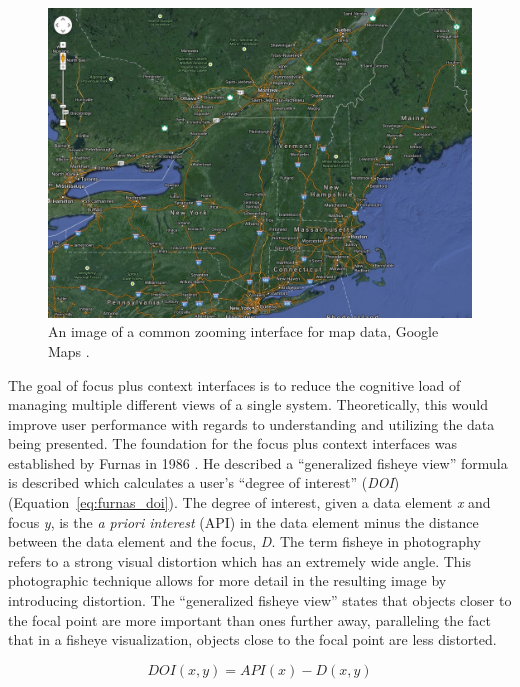 \begin{figure}[htp] \centering
    \includegraphics[width=0.8\linewidth]{img/zoom_interface.jpg}
    \caption[Zooming Interface]{An image of a common zooming interface for map data, Google Maps \cite{google_maps}.}
    \label{fig:google_maps}
\end{figure}

The goal of focus plus context interfaces is to reduce the cognitive load of managing multiple different views 
of a single system. Theoretically, this would improve user performance with regards to understanding and 
utilizing the data being presented. The foundation for the focus plus context interfaces was established by Furnas in 1986
\cite{Furnas1986}. He described a ``generalized fisheye view'' formula is described which 
calculates a user's ``degree of interest'' (\emph{DOI}) \cite{Furnas1986} (Equation~\ref{eq:furnas_doi}). The degree of interest, given a data element \emph{x} and focus \emph{y}, is the \emph{a priori interest} (API) in the data element minus the distance between the data element and the focus, \emph{D}.  The term fisheye in photography refers to a strong visual distortion which has an extremely wide angle. This photographic technique allows for more detail
in the resulting image by introducing distortion. The ``generalized fisheye view'' states that objects closer to the focal point are more important than ones further away, paralleling the fact that in a fisheye visualization, objects close to the focal point are less distorted.

\begin{equation}
    \label{eq:furnas_doi} 
    DOI(x, y) = API(x) - D(x,y)
\end{equation}

